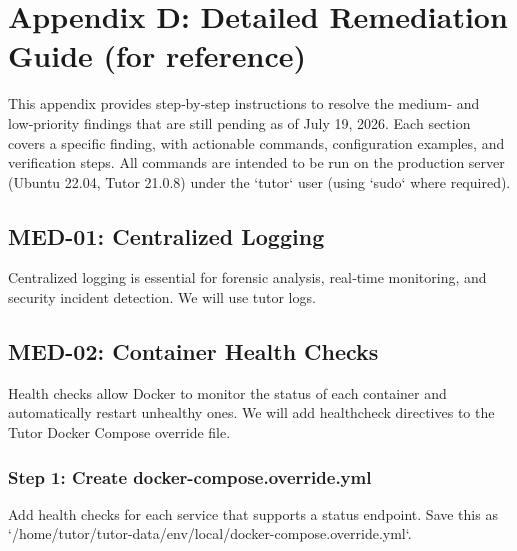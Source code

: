 \section{Appendix D: Detailed Remediation Guide (for reference)}
This appendix provides step‑by‑step instructions to resolve the medium‑ and low‑priority findings that are still pending as of July 19, 2026. Each section covers a specific finding, with actionable commands, configuration examples, and verification steps. All commands are intended to be run on the production server (Ubuntu 22.04, Tutor 21.0.8) under the `tutor` user (using `sudo` where required).

\subsection{MED-01: Centralized Logging}

Centralized logging is essential for forensic analysis, real‑time monitoring, and security incident detection.
We will use tutor logs.

\subsection{MED-02: Container Health Checks}

Health checks allow Docker to monitor the status of each container and automatically restart unhealthy ones. We will add healthcheck directives to the Tutor Docker Compose override file.

\subsubsection{Step 1: Create docker-compose.override.yml}

Add health checks for each service that supports a status endpoint. Save this as `/home/tutor/tutor-data/env/local/docker-compose.override.yml`.


